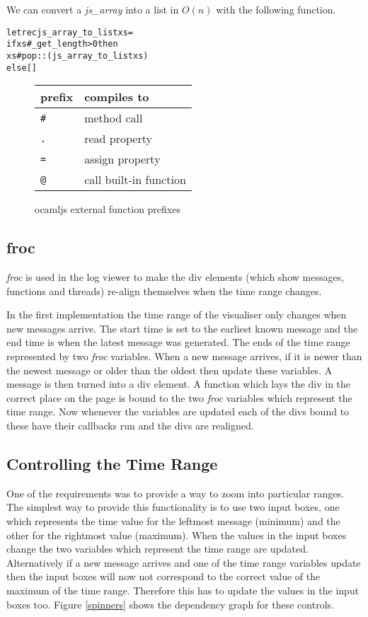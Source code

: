 We can convert a \emph{js\_array} into a list in \texttt{$O(n)$} with the following function.

\begin{alltt}
let rec js\_array\_to\_list xs =
  if xs\#\_get\_length > 0 then
    xs\#pop :: (js\_array\_to\_list xs)
  else []
\end{alltt}

\begin{figure}
  \centering
  \begin{tabular}{|l|l|}
    \hline
    \textbf{prefix} & \textbf{compiles to}\\ \hline
    \texttt{\#} & method call\\ \hline
    \texttt{.} & read property\\ \hline
    \texttt{=} & assign property\\ \hline
    \texttt{@} & call built-in function\\ \hline
  \end{tabular}
  \caption{ocamljs external function prefixes}
  \label{external}
\end{figure}

\subsection{froc}
\emph{froc} is used in the log viewer to make the div elements (which show messages, functions and threads) re-align themselves when the time range changes.

In the first implementation the time range of the visualiser only changes when new messages arrive. The start time is set to the earliest known message and the end time is when the latest message was generated. The ends of the time range represented by two \emph{froc} variables. When a new message arrives, if it is newer than the newest message or older than the oldest then update these variables. A message is then turned into a div element. A function which lays the div in the correct place on the page is bound to the two \emph{froc} variables which represent the time range. Now whenever the variables are updated each of the divs bound to these have their callbacks run and the divs are realigned.

\subsection{Controlling the Time Range}
One of the requirements was to provide a way to zoom into particular ranges. The simplest way to provide this functionality is to use two input boxes, one which represents the time value for the leftmost message (minimum) and the other for the rightmost value (maximum). When the values in the input boxes change the two variables which represent the time range are updated. Alternatively if a new message arrives and one of the time range variables update then the input boxes will now not correspond to the correct value of the maximum of the time range. Therefore this has to update the values in the input boxes too. Figure \ref{spinners} shows the dependency graph for these controls.

